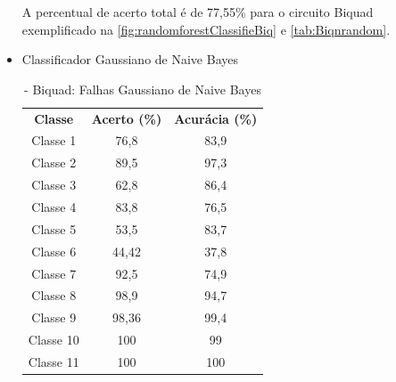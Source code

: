 \begin{itemize}
A percentual de acerto total é de 77,55\% para o circuito Biquad exemplificado na \ref{fig:randomforestClassifieBiq} e \ref{tab:Biqnrandom}. 

\newpage
 \item Classificador Gaussiano de Naive Bayes
 
 \begin{table}[ht]
\centering
\begin{tabular}{ccc}
\textbf{Classe} & \textbf{Acerto (\%)} & \textbf{Acurácia (\%)} \\
Classe 1        & 76,8                  & 83,9                   \\
Classe 2        & 89,5                  & 97,3                    \\
Classe 3        & 62,8                  & 86,4                    \\
Classe 4        & 83,8                  & 76,5                    \\
Classe 5        & 53,5                  & 83,7                    \\
Classe 6        & 44,42                & 37,8                    \\
Classe 7        & 92,5                  & 74,9                    \\
Classe 8        & 98,9                  & 94,7                    \\
Classe 9        & 98,36            & 99,4                   \\
Classe 10       & 100                  & 99                    \\
Classe 11       & 100                  & 100                                 
\end{tabular}
\caption{\label{tab:BiqnGND}- Biquad: Falhas Gaussiano de Naive Bayes}
\end{table}



\end{itemize}
